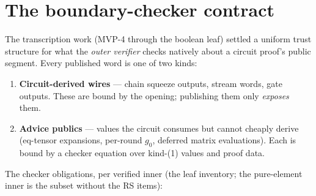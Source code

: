 \documentclass[11pt]{article}
\theoremstyle{definition}
\begin{document}
\section{The boundary-checker contract}\label{sec:boundary}

The transcription work (MVP-4 through the boolean leaf) settled a uniform
trust structure for what the \emph{outer verifier} checks natively about a
circuit proof's public segment. Every published word is one of two kinds:

\begin{enumerate}[nosep]
  \item \textbf{Circuit-derived wires} — chain squeeze outputs, stream
        words, gate outputs. These are bound by the opening; publishing
        them only \emph{exposes} them.
  \item \textbf{Advice publics} — values the circuit consumes but cannot
        cheaply derive (eq-tensor expansions, per-round $g_0$, deferred
        matrix evaluations). Each is bound by a checker equation over
        kind-(1) values and proof data.
\end{enumerate}

The checker obligations, per verified inner (the leaf inventory; the
pure-element inner is the subset without the RS items):
\end{document}
